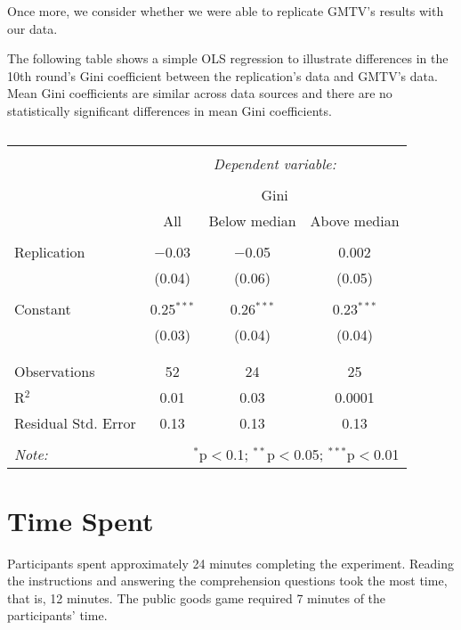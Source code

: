 \documentclass[11pt,]{article}
\begin{document}
Once more, we consider whether we were able to replicate GMTV's results
with our data.

The following table shows a simple OLS regression to illustrate
differences in the 10th round's Gini coefficient between the
replication's data and GMTV's data. Mean Gini coefficients are similar
across data sources and there are no statistically significant
differences in mean Gini coefficients.

\begin{table}[!htbp] \centering 
  \caption{} 
  \label{} 
\begin{tabular}{@{\extracolsep{5pt}}lccc} 
\\[-1.8ex]\hline 
\hline \\[-1.8ex] 
 & \multicolumn{3}{c}{\textit{Dependent variable:}} \\ 
\cline{2-4} 
\\[-1.8ex] & \multicolumn{3}{c}{Gini} \\ 
 & All & Below median & Above median \\ 
\hline \\[-1.8ex] 
 Replication & $-$0.03 & $-$0.05 & 0.002 \\ 
  & (0.04) & (0.06) & (0.05) \\ 
  & & & \\ 
 Constant & 0.25$^{***}$ & 0.26$^{***}$ & 0.23$^{***}$ \\ 
  & (0.03) & (0.04) & (0.04) \\ 
  & & & \\ 
\hline \\[-1.8ex] 
Observations & 52 & 24 & 25 \\ 
R$^{2}$ & 0.01 & 0.03 & 0.0001 \\ 
Residual Std. Error & 0.13 & 0.13 & 0.13 \\ 
\hline 
\hline \\[-1.8ex] 
\textit{Note:}  & \multicolumn{3}{r}{$^{*}$p$<$0.1; $^{**}$p$<$0.05; $^{***}$p$<$0.01} \\ 
\end{tabular} 
\end{table}

\hypertarget{time-spent}{%
\section{Time Spent}\label{time-spent}}

Participants spent approximately 24 minutes completing the experiment.
Reading the instructions and answering the comprehension questions took
the most time, that is, 12 minutes. The public goods game required 7
minutes of the participants' time.
\end{document}

